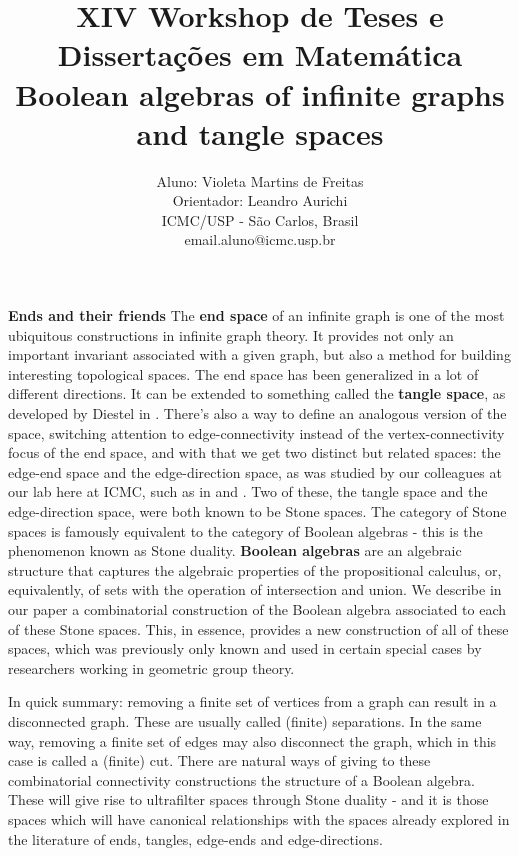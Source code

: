 \documentclass[11pt,a4paper]{article}
\title{\LARGE{\textbf{\textcolor[RGB]{196,145,2}{XIV Workshop de Teses e Dissertações em Matemática}}}\\ %
\vspace{1cm}
\LARGE{\textbf{Boolean algebras of infinite graphs and tangle spaces}}}
\author{Aluno: Violeta Martins de Freitas \\
Orientador: Leandro Aurichi \\
ICMC/USP - São Carlos, Brasil\\
email.aluno@icmc.usp.br}
\date{} %
\begin{document}
\maketitle

\thispagestyle{empty} %

\textbf{\large Ends and their friends}
The \textbf{end space} of an infinite graph is one of the most ubiquitous constructions in infinite graph theory. It provides not only an important invariant associated with a given graph, but also a method for building interesting topological spaces. The end space has been generalized in a lot of different directions. It can be extended to something called the \textbf{tangle space}, as developed by Diestel in \cite{tangle}. There's also a way to define an analogous version of the space, switching attention to edge-connectivity instead of the vertex-connectivity focus of the end space, and with that we get two distinct but related spaces: the edge-end space and the edge-direction space, as was studied by our colleagues at our lab here at ICMC, such as in \cite{edgelab1} and \cite{edgelab2}. Two of these, the tangle space and the edge-direction space, were both known to be Stone spaces. The category of Stone spaces is famously equivalent to the category of Boolean algebras - this is the phenomenon known as Stone duality. \textbf{Boolean algebras} are an algebraic structure that captures the algebraic properties of the propositional calculus, or, equivalently, of sets with the operation of intersection and union. We describe in our paper \cite{violeta} a combinatorial construction of the Boolean algebra associated to each of these Stone spaces. This, in essence, provides a new construction of all of these spaces, which was previously only known and used in certain special cases by researchers working in geometric group theory.

In quick summary: removing a finite set of vertices from a graph can result in a disconnected graph. These are usually called (finite) separations. In the same way,  removing a finite set of edges may also disconnect the graph, which in this case is called a (finite) cut. There are natural ways of giving to these combinatorial connectivity constructions the structure of a Boolean algebra. These will give rise to ultrafilter spaces through Stone duality - and it is those spaces which will have canonical relationships with the spaces already explored in the literature of ends, tangles, edge-ends and edge-directions. 
\end{document}
